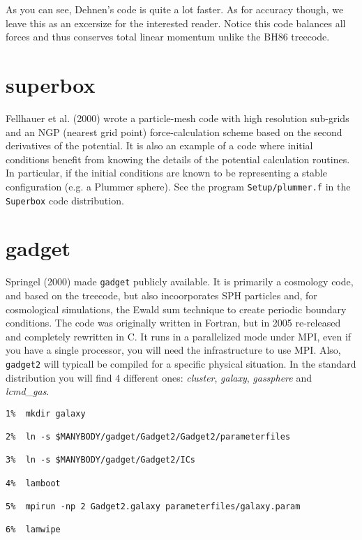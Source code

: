 As you can see, Dehnen's code is quite a lot faster. As for accuracy though, we leave
this as an excersize for the interested reader. Notice this code balances all forces
and thus conserves total linear momentum unlike the BH86 treecode.

\section{superbox}

Fellhauer et al. (2000) wrote a particle-mesh code with high resolution
sub-grids and an NGP (nearest grid point) force-calculation scheme
based on the second derivatives of the potential.  It is also an example of 
a code where initial conditions benefit from knowing the details of the
potential calculation routines. In particular, if the initial conditions
are known to be representing a stable configuration (e.g. a Plummer sphere).
See the program {\tt Setup/plummer.f} in the {\tt Superbox} code distribution.

\section{gadget}

Springel (2000) made {\tt gadget} publicly available.
It is primarily a cosmology code, and based on the treecode, but also incoorporates 
SPH particles
and, for cosmological simulations, the Ewald sum technique to create periodic
boundary conditions. The code was originally written in Fortran, but in 2005 re-released
and completely rewritten in C. It runs in a parallelized mode under MPI, even if you 
have a single processor, you will need the infrastructure to use MPI. Also,
{\tt gadget2} will typicall be compiled for a specific physical situation. In the
standard distribution you will find 4 different ones: 
{\it cluster}, {\it galaxy}, {\it gassphere} and 
{\it lcmd\_gas}.

\footnotesize\begin{verbatim}
1%  mkdir galaxy

2%  ln -s $MANYBODY/gadget/Gadget2/Gadget2/parameterfiles

3%  ln -s $MANYBODY/gadget/Gadget2/ICs

4%  lamboot

5%  mpirun -np 2 Gadget2.galaxy parameterfiles/galaxy.param

6%  lamwipe

\end{verbatim}\normalsize

